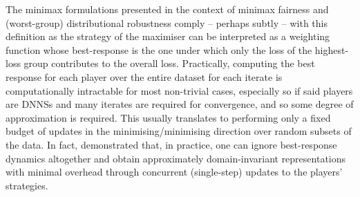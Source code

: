 %
The minimax formulations presented in the context of minimax fairness and (worst-group)
distributional robustness comply -- perhaps subtly -- with this definition as the strategy of the
maximiser can be interpreted as a weighting function whose best-response is the one under which
only the loss of the highest-loss group contributes to the overall loss. 
%
Practically, computing the best response for each player over the entire dataset for each iterate
is computationally intractable for most non-trivial cases, especially so if said players are
\acp{DNNS} and many iterates are required for convergence, and so some degree of approximation is
required.
%
This usually translates to performing only a fixed budget of updates in the minimising/minimising
direction over random subsets of the data.
%
In fact, \cite{ganin2016domain} demonstrated that, in practice, one can ignore best-response
dynamics altogether and obtain approximately domain-invariant representations with minimal overhead
through concurrent (single-step) updates to the players' strategies.


